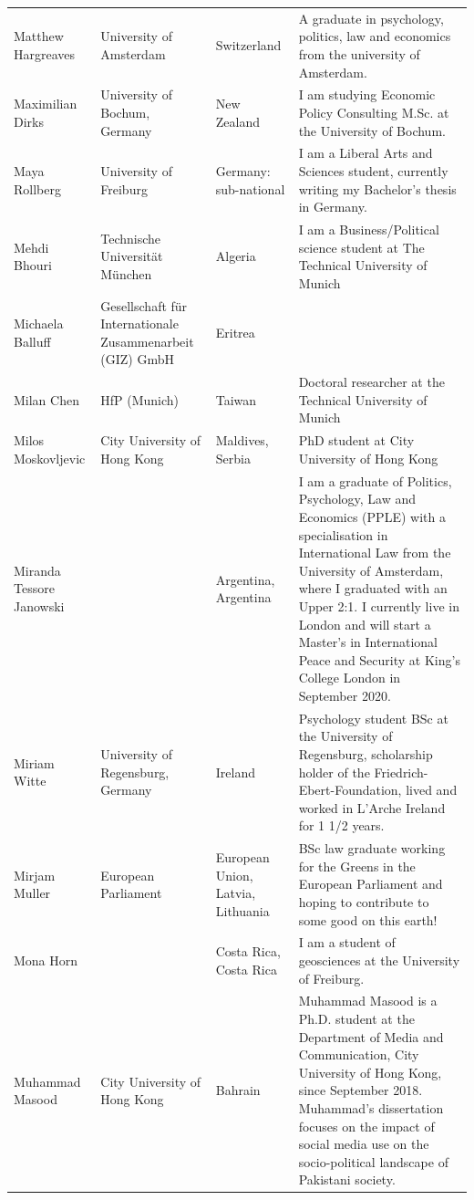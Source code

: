 \documentclass[]{article}
\begin{document}
\begin{longtable}{l>{\raggedright\arraybackslash}p{2cm}>{\raggedright\arraybackslash}p{2cm}>{\raggedright\arraybackslash}p{3cm}}
\rowcolor{gray!6}  Matthew Hargreaves & University of Amsterdam & Switzerland & A graduate in psychology, politics, law and economics from the university of Amsterdam.\\
Maximilian Dirks & University of Bochum, Germany & New Zealand & I am studying Economic Policy Consulting M.Sc. at the University of Bochum.\\
\rowcolor{gray!6}  Maya Rollberg & University of Freiburg & Germany: sub-national & I am a Liberal Arts and Sciences student, currently writing my Bachelor's thesis in Germany.\\
Mehdi Bhouri & Technische Universität München & Algeria & I am a Business/Political science student at The Technical University of Munich\\
\addlinespace
\rowcolor{gray!6}  Michaela Balluff & Gesellschaft für Internationale Zusammenarbeit (GIZ) GmbH & Eritrea & \\
Milan Chen & HfP (Munich) & Taiwan & Doctoral researcher at the Technical University of Munich\\
\rowcolor{gray!6}  Milos Moskovljevic & City University of Hong Kong & Maldives, Serbia & PhD student at City University of Hong Kong\\
Miranda Tessore Janowski &  & Argentina, Argentina & I am a graduate of Politics, Psychology, Law and Economics (PPLE) with a specialisation in International Law from the University of Amsterdam, where I graduated with an Upper 2:1. I currently live in London and will start a Master's in International Peace and Security at King's College London in September 2020.\\
\rowcolor{gray!6}  Miriam Witte & University of Regensburg, Germany & Ireland & Psychology student BSc at the University of Regensburg, scholarship holder of the Friedrich-Ebert-Foundation, lived and worked in L'Arche Ireland for 1 1/2 years.\\
\addlinespace
Mirjam Muller & European Parliament & European Union, Latvia, Lithuania & BSc law graduate working for the Greens in the European Parliament and hoping to contribute to some good on this earth!\\
\rowcolor{gray!6}  Mona Horn &  & Costa Rica, Costa Rica & I am a student of geosciences at the University of Freiburg.\\
Muhammad Masood & City University of Hong Kong & Bahrain & Muhammad Masood is a Ph.D. student at the Department of Media and Communication, City University of Hong Kong, since September 2018. Muhammad's dissertation focuses on the impact of social media use on the socio-political landscape of Pakistani society.\\

\end{longtable}
\end{document}
